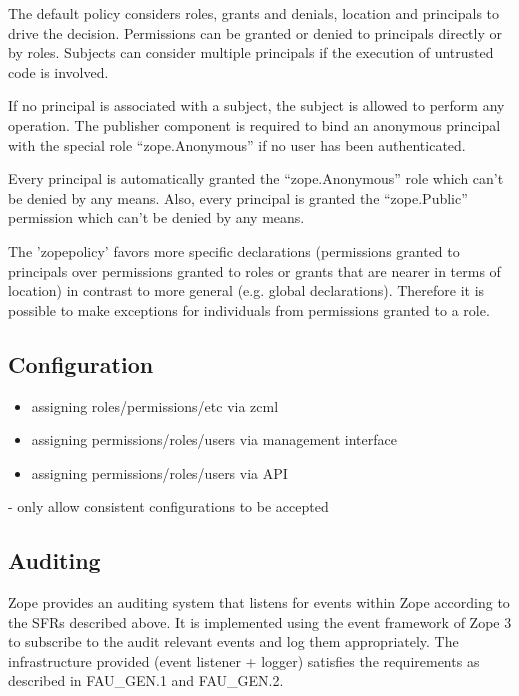 \documentclass[12pt,english]{scrbook}
\begin{document}
The default policy considers roles, grants and denials, location and principals
to drive the decision. Permissions can be granted or denied to principals
directly or by roles.  Subjects can consider multiple principals if the
execution of untrusted code is involved.

If no principal is associated with a subject, the subject is allowed to perform
any operation. The publisher component is required to bind an anonymous
principal with the special role ``zope.Anonymous'' if no user has been
authenticated.

Every principal is automatically granted the ``zope.Anonymous'' role which can't be
denied by any means. Also, every principal is granted the ``zope.Public''
permission which can't be denied by any means.

The 'zopepolicy' favors more specific declarations (permissions granted to
principals over permissions granted to roles or grants that are nearer in terms
of location) in contrast to more general (e.g. global declarations). Therefore
it is possible to make exceptions for individuals from permissions granted to a
role.




\subsection{Configuration}

\begin{itemize}
  \item assigning roles/permissions/etc via zcml
  \item assigning permissions/roles/users via management interface
  \item assigning permissions/roles/users via API
\end{itemize}

- only allow consistent configurations to be accepted

\subsection{Auditing}

Zope provides an auditing system that listens for events within Zope according
to the SFRs described above. It is implemented using the event framework of
Zope 3 to subscribe to the audit relevant events and log them appropriately.
The infrastructure provided (event listener + logger) satisfies the
requirements as described in FAU{\_}GEN.1 and FAU{\_}GEN.2.
\end{document}
